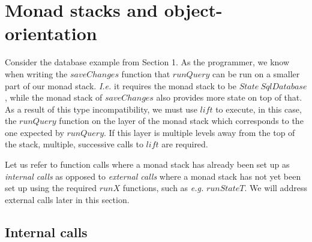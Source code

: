 \section{Monad stacks and object-orientation}

Consider the database example from Section 1. As the programmer, we know when writing the $\mathit{saveChanges}$ function that $\mathit{runQuery}$ can be run on a smaller part of our monad stack. \emph{I.e.} it requires the monad stack to be $\mathit{State}~\mathit{SqlDatabase}$, while the monad stack of $\mathit{saveChanges}$ also provides more state on top of that. As a result of this type incompatibility, we must use $\mathit{lift}$ to execute, in this case, the $\mathit{runQuery}$ function on the layer of the monad stack which corresponds to the one expected by $\mathit{runQuery}$. If this layer is multiple levels away from the top of the stack, multiple, successive calls to $\mathit{lift}$ are required.

Let us refer to function calls where a monad stack has already been set up as \emph{internal calls} as opposed to \emph{external calls} where a monad stack has not yet been set up using the required $\mathit{runX}$ functions, such as \emph{e.g.} $\mathit{runStateT}$. We will address external calls later in this section. 

\subsection{Internal calls}

